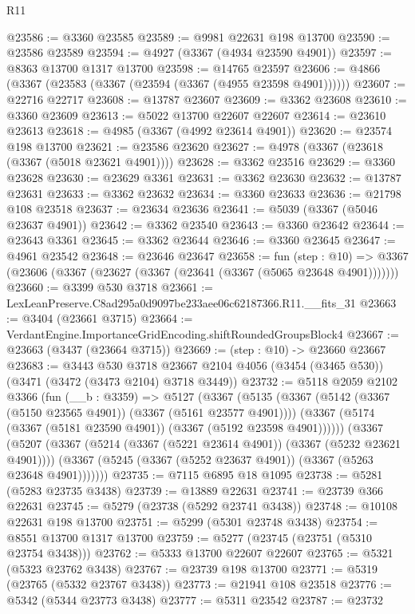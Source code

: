 \begin{lexlean}{R11}
\begin{coremodule}
@23586 := @3360 @23585
@23589 := @9981 @22631 @198 @13700
@23590 := @23586 @23589
@23594 := @4927 (@3367 (@4934 @23590 @4901))
@23597 := @8363 @13700 @1317 @13700
@23598 := @14765 @23597
@23606 := @4866 (@3367 (@23583 (@3367 (@23594 (@3367 (@4955 @23598 @4901))))))
@23607 := @22716 @22717
@23608 := @13787 @23607
@23609 := @3362 @23608
@23610 := @3360 @23609
@23613 := @5022 @13700 @22607 @22607
@23614 := @23610 @23613
@23618 := @4985 (@3367 (@4992 @23614 @4901))
@23620 := @23574 @198 @13700
@23621 := @23586 @23620
@23627 := @4978 (@3367 (@23618 (@3367 (@5018 @23621 @4901))))
@23628 := @3362 @23516
@23629 := @3360 @23628
@23630 := @23629 @3361
@23631 := @3362 @23630
@23632 := @13787 @23631
@23633 := @3362 @23632
@23634 := @3360 @23633
@23636 := @21798 @108 @23518
@23637 := @23634 @23636
@23641 := @5039 (@3367 (@5046 @23637 @4901))
@23642 := @3362 @23540
@23643 := @3360 @23642
@23644 := @23643 @3361
@23645 := @3362 @23644
@23646 := @3360 @23645
@23647 := @4961 @23542
@23648 := @23646 @23647
@23658 := fun (step : @10) =>
  @3367 (@23606 (@3367 (@23627 (@3367 (@23641 (@3367 (@5065 @23648 @4901)))))))
@23660 := @3399 @530 @3718
@23661 := LexLeanPreserve.C8ad295a0d9097be233aee06c62187366.R11.__fits_31
@23663 := @3404 (@23661 @3715)
@23664 := VerdantEngine.ImportanceGridEncoding.shiftRoundedGroupsBlock4
@23667 := @23663 (@3437 (@23664 @3715))
@23669 := (step : @10) -> @23660 @23667
@23683 := @3443
    @530
    @3718
    @23667
    @2104
    @4056
    (@3454 (@3465 @530))
    (@3471 (@3472 (@3473 @2104) @3718 @3449))
@23732 := @5118
    @2059
    @2102
    @3366
    (fun (__b : @3359) =>
    @5127
      (@3367
        (@5135
          (@3367 (@5142 (@3367 (@5150 @23565 @4901)) (@3367 (@5161 @23577 @4901))))
          (@3367 (@5174 (@3367 (@5181 @23590 @4901)) (@3367 (@5192 @23598 @4901))))))
      (@3367
        (@5207
          (@3367 (@5214 (@3367 (@5221 @23614 @4901)) (@3367 (@5232 @23621 @4901))))
          (@3367 (@5245 (@3367 (@5252 @23637 @4901)) (@3367 (@5263 @23648 @4901)))))))
@23735 := @7115 @6895 @18 @1095
@23738 := @5281 (@5283 @23735 @3438)
@23739 := @13889 @22631
@23741 := @23739 @366 @22631
@23745 := @5279 (@23738 (@5292 @23741 @3438))
@23748 := @10108 @22631 @198 @13700
@23751 := @5299 (@5301 @23748 @3438)
@23754 := @8551 @13700 @1317 @13700
@23759 := @5277 (@23745 (@23751 (@5310 @23754 @3438)))
@23762 := @5333 @13700 @22607 @22607
@23765 := @5321 (@5323 @23762 @3438)
@23767 := @23739 @198 @13700
@23771 := @5319 (@23765 (@5332 @23767 @3438))
@23773 := @21941 @108 @23518
@23776 := @5342 (@5344 @23773 @3438)
@23777 := @5311 @23542
@23787 := @23732

\end{coremodule}
\end{lexlean}
